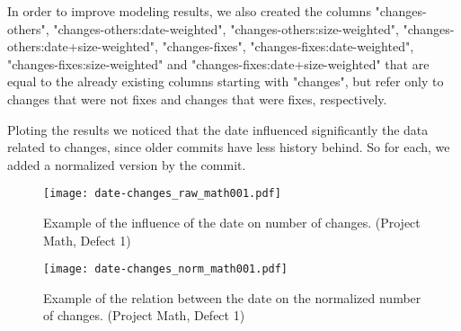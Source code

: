 In order to improve modeling results, we also created the columns "changes-others", "changes-others:date-weighted", "changes-others:size-weighted", "changes-others:date+size-weighted", 
"changes-fixes", "changes-fixes:date-weighted", "changes-fixes:size-weighted" and "changes-fixes:date+size-weighted" that are equal to the already existing columns starting with
"changes", but refer only to changes that were not fixes and changes that were fixes, respectively.

Ploting the results we noticed that the date influenced significantly the data related to changes, since older commits have less history behind. 
So for each, we added a normalized version by the commit.

\begin{figure}[H]
  \begin{center}
    \leavevmode
    \texttt{[image: date-changes\_raw\_math001.pdf]}
    \caption{Example of the influence of the date on number of changes. (Project Math, Defect 1)}
    \label{fig:date-changes.raw}
  \end{center}
\end{figure}

\begin{figure}[H]
  \begin{center}
    \leavevmode
    \texttt{[image: date-changes\_norm\_math001.pdf]}
    \caption{Example of the relation between the date on the normalized number of changes. (Project Math, Defect 1)}
    \label{fig:date-changes.norm}
  \end{center}
\end{figure}


